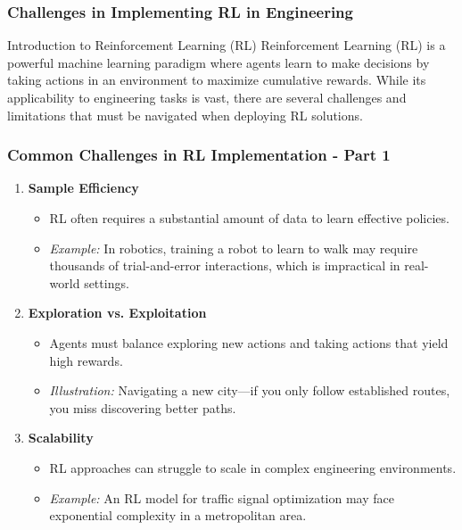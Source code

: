 \documentclass[aspectratio=169]{beamer}
\begin{document}
\begin{frame}[fragile]
    \frametitle{Challenges in Implementing RL in Engineering}
    \begin{block}{Introduction to Reinforcement Learning (RL)}
        Reinforcement Learning (RL) is a powerful machine learning paradigm where agents learn to make decisions by taking actions in an environment to maximize cumulative rewards. While its applicability to engineering tasks is vast, there are several challenges and limitations that must be navigated when deploying RL solutions.
    \end{block}
\end{frame}

\begin{frame}[fragile]
    \frametitle{Common Challenges in RL Implementation - Part 1}
    \begin{enumerate}
        \item \textbf{Sample Efficiency}
        \begin{itemize}
            \item RL often requires a substantial amount of data to learn effective policies. 
            \item \textit{Example:} In robotics, training a robot to learn to walk may require thousands of trial-and-error interactions, which is impractical in real-world settings.
        \end{itemize}
        
        \item \textbf{Exploration vs. Exploitation}
        \begin{itemize}
            \item Agents must balance exploring new actions and taking actions that yield high rewards. 
            \item \textit{Illustration:} Navigating a new city—if you only follow established routes, you miss discovering better paths.
        \end{itemize}
        
        \item \textbf{Scalability}
        \begin{itemize}
            \item RL approaches can struggle to scale in complex engineering environments.
            \item \textit{Example:} An RL model for traffic signal optimization may face exponential complexity in a metropolitan area.
        \end{itemize}
    \end{enumerate}
\end{frame}
\end{document}
